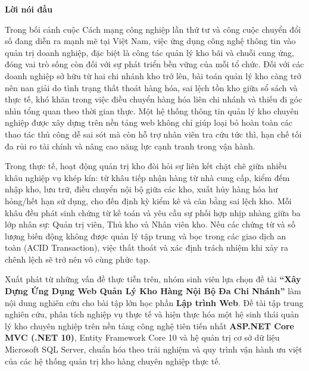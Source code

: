 \documentclass[12pt,a4paper]{report}
\renewcommand{\_}{\textunderscore\allowbreak}
\begin{document}
\clearpage
\begin{center}
    \vspace*{0.5cm}
    {\Huge \textbf{Lời nói đầu}}
    \vspace{0.5cm}
\end{center}

Trong bối cảnh cuộc Cách mạng công nghiệp lần thứ tư và công cuộc chuyển đổi số đang diễn ra mạnh mẽ tại Việt Nam, việc ứng dụng công nghệ thông tin vào quản trị doanh nghiệp, đặc biệt là công tác quản lý kho bãi và chuỗi cung ứng, đóng vai trò sống còn đối với sự phát triển bền vững của mỗi tổ chức. Đối với các doanh nghiệp sở hữu từ hai chi nhánh kho trở lên, bài toán quản lý kho càng trở nên nan giải do tình trạng thất thoát hàng hóa, sai lệch tồn kho giữa sổ sách và thực tế, khó khăn trong việc điều chuyển hàng hóa liên chi nhánh và thiếu đi góc nhìn tổng quan theo thời gian thực. Một hệ thống thông tin quản lý kho chuyên nghiệp được xây dựng trên nền tảng web không chỉ giúp loại bỏ hoàn toàn các thao tác thủ công dễ sai sót mà còn hỗ trợ nhân viên tra cứu tức thì, hạn chế tối đa rủi ro tài chính và nâng cao năng lực cạnh tranh trong vận hành.

Trong thực tế, hoạt động quản trị kho đòi hỏi sự liên kết chặt chẽ giữa nhiều khâu nghiệp vụ khép kín: từ khâu tiếp nhận hàng từ nhà cung cấp, kiểm đếm nhập kho, lưu trữ, điều chuyển nội bộ giữa các kho, xuất hủy hàng hóa hư hỏng/hết hạn sử dụng, cho đến định kỳ kiểm kê và cân bằng sai lệch kho. Mỗi khâu đều phát sinh chứng từ kế toán và yêu cầu sự phối hợp nhịp nhàng giữa ba lớp nhân sự: Quản trị viên, Thủ kho và Nhân viên kho. Nếu các chứng từ và số lượng biến động không được quản lý tập trung và bọc trong các giao dịch an toàn (ACID Transaction), việc thất thoát và xác định trách nhiệm khi xảy ra chênh lệch sẽ trở nên vô cùng phức tạp.

Xuất phát từ những vấn đề thực tiễn trên, nhóm sinh viên lựa chọn đề tài \textbf{``Xây Dựng Ứng Dụng Web Quản Lý Kho Hàng Nội Bộ Đa Chi Nhánh''} làm nội dung nghiên cứu cho bài tập lớn học phần \textbf{Lập trình Web}. Đề tài tập trung nghiên cứu, phân tích nghiệp vụ thực tế và hiện thực hóa một hệ sinh thái quản lý kho chuyên nghiệp trên nền tảng công nghệ tiên tiến nhất \textbf{ASP.NET Core MVC (.NET 10)}, Entity Framework Core 10 và hệ quản trị cơ sở dữ liệu Microsoft SQL Server, chuẩn hóa theo trải nghiệm và quy trình vận hành ưu việt của các hệ thống quản trị kho hàng chuyên nghiệp thực tế.
\end{document}

